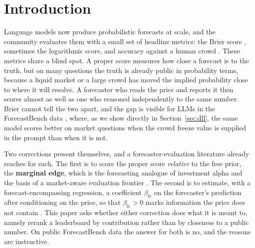 \documentclass[11pt]{article}
\begin{document}
\begin{abstract}
agentic research/tool systems sit modestly higher, a fragile signal we offer only as a hypothesis that contribution comes from research, not scale. The human comparison rests on the one released human round; we use it as a positive control on the metric rather than a population estimate, and mark it as such throughout.
\end{abstract}

\section{Introduction}

Language models now produce probabilistic forecasts at scale, and the community evaluates them with a small set of headline metrics: the Brier score \citep{brier1950}, sometimes the logarithmic score, and accuracy against a human crowd \citep{halawi2024,karger2024,lu2025}. These metrics share a blind spot. A proper score measures how close a forecast is to the truth, but on many questions the truth is already public in probability terms, because a liquid market or a large crowd has moved the implied probability close to where it will resolve. A forecaster who reads the price and reports it then scores almost as well as one who reasoned independently to the same number. Brier cannot tell the two apart, and the gap is visible for LLMs in the ForecastBench data \citep{karger2024}, where, as we show directly in Section~\ref{sec:dll}, the same model scores better on market questions when the crowd freeze value is supplied in the prompt than when it is not.

Two corrections present themselves, and a forecaster-evaluation literature already reaches for each. The first is to score the proper score \emph{relative} to the free prior, the \textbf{marginal edge}, which is the forecasting analogue of investment alpha and the basis of a market-aware evaluation frontier \citep{yang2025,alur2025}. The second is to estimate, with a forecast-encompassing regression, a coefficient $\beta_{\mathrm{fc}}$ on the forecaster's prediction after conditioning on the price, so that $\beta_{\mathrm{fc}}>0$ marks information the price does not contain \citep{fair1990,clements2010}. This paper asks whether either correction does what it is meant to, namely rerank a leaderboard by contribution rather than by closeness to a public number. On public ForecastBench data the answer for both is no, and the reasons are instructive.
\end{document}
